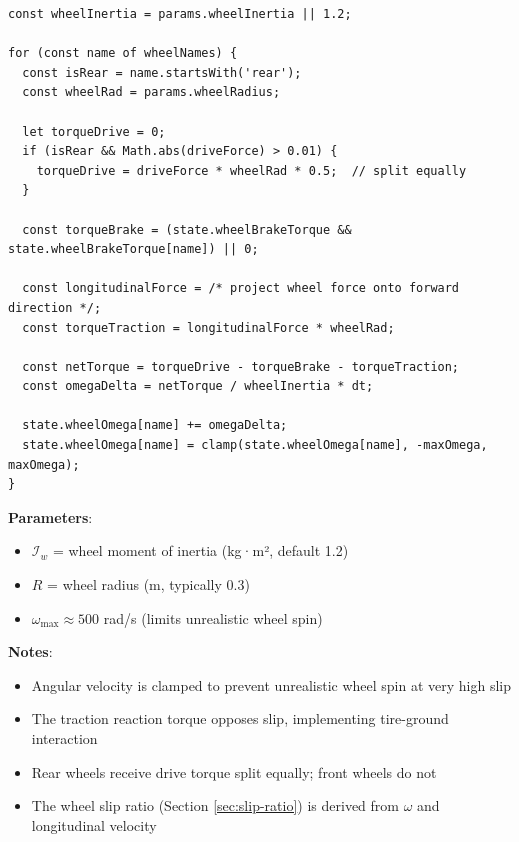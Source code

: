 \begin{lstlisting}[caption={Wheel torque integration}]
const wheelInertia = params.wheelInertia || 1.2;

for (const name of wheelNames) {
  const isRear = name.startsWith('rear');
  const wheelRad = params.wheelRadius;

  let torqueDrive = 0;
  if (isRear && Math.abs(driveForce) > 0.01) {
    torqueDrive = driveForce * wheelRad * 0.5;  // split equally
  }

  const torqueBrake = (state.wheelBrakeTorque && state.wheelBrakeTorque[name]) || 0;

  const longitudinalForce = /* project wheel force onto forward direction */;
  const torqueTraction = longitudinalForce * wheelRad;

  const netTorque = torqueDrive - torqueBrake - torqueTraction;
  const omegaDelta = netTorque / wheelInertia * dt;

  state.wheelOmega[name] += omegaDelta;
  state.wheelOmega[name] = clamp(state.wheelOmega[name], -maxOmega, maxOmega);
}
\end{lstlisting}

\textbf{Parameters}:
\begin{itemize}
  \item $\mathcal{I}_w$ = wheel moment of inertia (kg·m², default 1.2)
  \item $R$ = wheel radius (m, typically 0.3)
  \item $\omega_{\text{max}} \approx 500$ rad/s (limits unrealistic wheel spin)
\end{itemize}

\textbf{Notes}:
\begin{itemize}
  \item Angular velocity is clamped to prevent unrealistic wheel spin at very high slip
  \item The traction reaction torque opposes slip, implementing tire-ground interaction
  \item Rear wheels receive drive torque split equally; front wheels do not
  \item The wheel slip ratio (Section \ref{sec:slip-ratio}) is derived from $\omega$ and longitudinal velocity
\end{itemize}

\newpage

